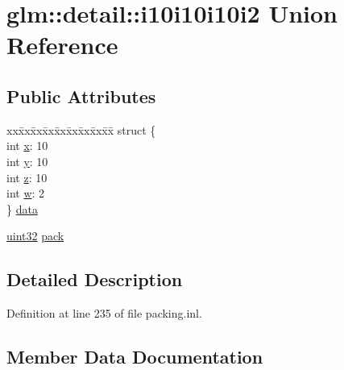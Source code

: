 \hypertarget{unionglm_1_1detail_1_1i10i10i10i2}{}\section{glm\+:\+:detail\+:\+:i10i10i10i2 Union Reference}
\label{unionglm_1_1detail_1_1i10i10i10i2}
\subsection*{Public Attributes}
\begin{DoxyCompactItemize}
\item 
\begin{tabbing}
xx\=xx\=xx\=xx\=xx\=xx\=xx\=xx\=xx\=\kill
struct \{\\
\>int \hyperlink{unionglm_1_1detail_1_1i10i10i10i2_a290d519ee2feaba6ae4b5244d5d90e7b}{x}: 10\\
\>int \hyperlink{unionglm_1_1detail_1_1i10i10i10i2_ae76bb89adeb66d1ee5bb2b265e87fc1b}{y}: 10\\
\>int \hyperlink{unionglm_1_1detail_1_1i10i10i10i2_a95398090414de32eaaf9cb3c3bd3fa48}{z}: 10\\
\>int \hyperlink{unionglm_1_1detail_1_1i10i10i10i2_a20c12acbdb874a476b158164acd17abd}{w}: 2\\
\} \hyperlink{unionglm_1_1detail_1_1i10i10i10i2_a71accc873d6af9366cd38aacfa23bb35}{data}\\

\end{tabbing}\item 
\hyperlink{namespaceglm_1_1detail_ade6cfbf377022aaa391af8cd50489222}{uint32} \hyperlink{unionglm_1_1detail_1_1i10i10i10i2_a24e2dc324c86589d568dc330904c859a}{pack}
\end{DoxyCompactItemize}


\subsection{Detailed Description}


Definition at line 235 of file packing.\+inl.



\subsection{Member Data Documentation}
\mbox{\label{unionglm_1_1detail_1_1i10i10i10i2_a71accc873d6af9366cd38aacfa23bb35}} 
